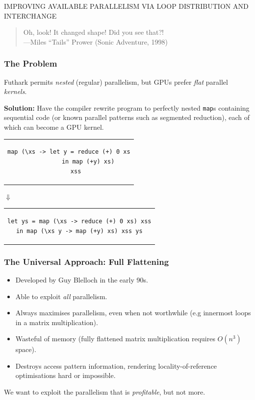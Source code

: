 \documentclass[rgb,dvipsnames]{beamer}
\begin{document}
\begin{frame}
  \begin{center}
    \Huge IMPROVING AVAILABLE PARALLELISM VIA LOOP DISTRIBUTION AND INTERCHANGE
  \end{center}

\vfill
  \begin{quote}
    Oh, look! It changed shape! Did you see that?! \\\hfill ---Miles ``Tails'' Prower (Sonic Adventure, 1998)
  \end{quote}
\end{frame}

\begin{frame}[fragile]
  \frametitle{The Problem}

  Futhark permits \textit{nested} (regular) parallelism, but GPUs
  prefer \textit{flat} parallel \textit{kernels}.

  \pause \vspace{1cm} \textbf{Solution:} Have the compiler rewrite
  program to perfectly nested \lstinline{map}s containing sequential
  code (or known parallel patterns such as segmented reduction), each
  of which can become a GPU kernel.  \pause
\begin{center}
\begin{tabular}{c}
\begin{lstlisting}
map (\xs -> let y = reduce (+) 0 xs
           in map (+y) xs)
    xss
\end{lstlisting}
\end{tabular}

  $\Downarrow$

\begin{tabular}{c}
\begin{lstlisting}
let ys = map (\xs -> reduce (+) 0 xs) xss
in map (\xs y -> map (+y) xs) xss ys
\end{lstlisting}
\end{tabular}
\end{center}
\end{frame}

\begin{frame}
  \frametitle{The Universal Approach: Full Flattening}

  \begin{itemize}
  \item Developed by Guy Blelloch in the early 90s.
  \item Able to exploit \textit{all} parallelism.
  \item Always maximises parallelism, even when not worthwhile (e.g
    innermost loops in a matrix multiplication).
  \item Wasteful of memory (fully flattened matrix multiplication
    requires $O(n^{3})$ space).
  \item Destroys access pattern information, rendering
    locality-of-reference optimisations hard or impossible.
  \end{itemize}

  We want to exploit the parallelism that is \textit{profitable}, but
  not more.

\end{frame}
\end{document}

